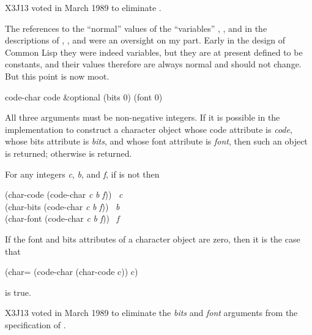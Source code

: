 \begin{newer}
X3J13 voted in March 1989 
to eliminate .
\end{newer}
\medskip
\begin{new}
The references to the ``normal'' values of the ``variables''
,
, and  in the descriptions
of , , and  were an oversight on
my part.  Early in the design of Common Lisp they were indeed variables,
but they are at present defined to be constants, and their values therefore
are always normal and should not change.  But this point is now moot.
\end{new}

\begin{defun}[Function]
code-char code &optional (bits 0) (font 0)

\begin{obsolete}
All three arguments must be non-negative integers.
If it is possible in the implementation to construct a character
object whose code attribute is {\it code}, whose bits attribute is {\it bits},
and whose font attribute is {\it font}, then such an object is returned;
otherwise {\false} is returned.

For any integers {\it c}, {\it b}, and {\it f}, if 
is not {\false} then
\begin{lisp}
(char-code (code-char {\it c} {\it b} {\it f})) \EV\ {\it c} \\
(char-bits (code-char {\it c} {\it b} {\it f})) \EV\ {\it b} \\
(char-font (code-char {\it c} {\it b} {\it f})) \EV\ {\it f}
\end{lisp}
If the font and bits attributes of a character object  are zero,
then it is the case that
\begin{lisp}
(char= (code-char (char-code c)) c)
\end{lisp}
is true.
\end{obsolete}
\begin{newer}
X3J13 voted in March 1989 
to eliminate the {\it bits} and {\it font} arguments from
the specification of .
\end{newer}
\end{defun}


